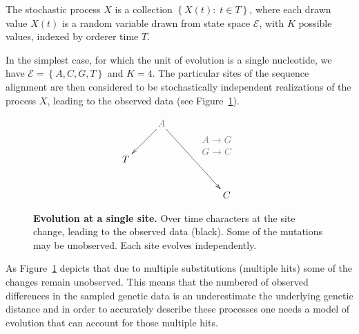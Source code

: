 \begin{definition} 
The stochastic process $X$ is a collection $\left\{ X(t):\; t\in T\right\} $, where each drawn value $X(t)$ is a random variable drawn from state space $\mathcal{E}$, with $K$ possible values, indexed by orderer time $T$.
\label{def:stochasticProc}
\end{definition} 

In the simplest case, for which the unit of evolution is a single nucleotide, we have $\mathcal{E}=\left\{ A,C,G,T\right\}$ and $K=4$.
The particular sites of the sequence alignment are then considered to be stochastically independent realizations of the process $X$, leading to the observed data (see Figure~\ref{fig:alignment}). 

\begin{figure}[H]
\centering
\begingroup
\everymath{\displaystyle}
{\Large
\begin{displaymath} %
\xymatrix{
& \color{gray2}A \ar[dl] \ar[drdr]^{ \color{gray2}\begin{array}{c}
A\rightarrow G\\
G\rightarrow C
\end{array}} & & \\
T & & & \\
& & & C \\
}
\end{displaymath}
}%
\endgroup
\caption{
{ \footnotesize 
{\bf Evolution at a single site.} Over time characters at the site change, leading to the observed data (black). 
Some of the mutations may be unobserved. 
Each site evolves independently.
}%
}
\label{fig:alignment}
\end{figure}

As Figure~\ref{fig:alignment} depicts that due to multiple substitutions (multiple hits) some of the changes remain unobserved.
This means that the numbered of observed differences in the sampled genetic data is an underestimate the underlying genetic distance and in order to accurately describe these processes one needs a model of evolution that can account for those multiple hits.

